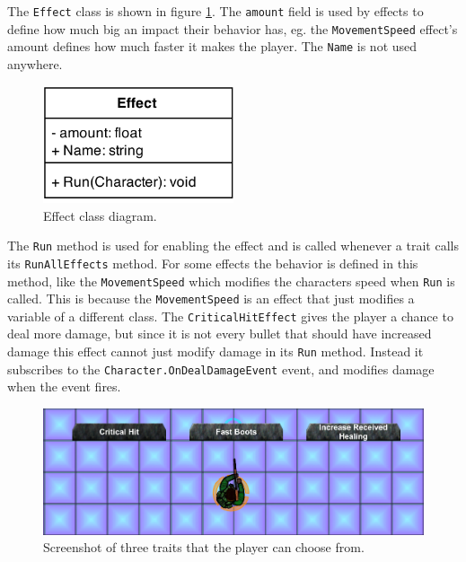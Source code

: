 The \texttt{Effect} class is shown in figure \ref{traits:effectclassdiagram}.
The \texttt{amount} field is used by effects to define how much big an impact their behavior has, eg. the \texttt{MovementSpeed} effect's amount defines how much faster it makes the player.
The \texttt{Name} is not used anywhere.
\begin{figure}[H]
\centering
\includegraphics[width=0.5\textwidth]{figures/traits/EffectClassDiagram.png}
\caption{Effect class diagram.}
\label{traits:effectclassdiagram}
\end{figure}
The \texttt{Run} method is used for enabling the effect and is called whenever a trait calls its \texttt{RunAllEffects} method.
For some effects the behavior is defined in this method, like the \texttt{MovementSpeed} which modifies the characters speed when \texttt{Run} is called.
This is because the \texttt{MovementSpeed} is an effect that just modifies a variable of a different class.
The \texttt{CriticalHitEffect} gives the player a chance to deal more damage, but since it is not every bullet that should have increased damage this effect cannot just modify damage in its \texttt{Run} method.
Instead it subscribes to the \texttt{Character.OnDealDamageEvent} event, and modifies damage when the event fires.





\begin{figure}[H]
\centering
\includegraphics[scale=0.3]{figures/traits/Traits.png}
\caption{Screenshot of three traits that the player can choose from.}
\label{traits:traitselection:traits}
\end{figure}